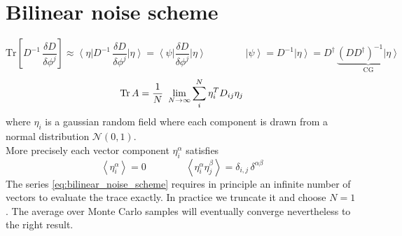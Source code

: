 \section{Bilinear noise scheme}
\begin{equation*}
    \text{Tr} \left[ D^{-1} \, \frac{\delta D}{\delta \phi^j} \right] \approx \left\langle \eta \right|  D^{-1} \, \frac{\delta D}{\delta \phi^j} \left| \eta \right\rangle = 
    \left\langle \psi \right| \frac{\delta D}{\delta \phi^j} \left| \eta \right\rangle
    \qquad\qquad \left| \psi \right\rangle = D^{-1} \left| \eta \right\rangle = D^\dagger \, \underbrace{(D D^\dagger)^{-1} \left| \eta \right\rangle}_{\text{CG}}
\end{equation*}
\begin{equation}
    \operatorname{\text{Tr}} {A} = \frac{1}{N} \ \lim_{N \to \infty} \sum_i^N \eta_i^T D_{ij} \eta_j
    \label{eq:bilinear_noise_scheme}
\end{equation}
where $\eta_i$ is a gaussian random field where each component is drawn from a normal distribution $\mathcal{N}(0,1)$. \\
More precisely each vector component $\eta_i^\alpha$ satisfies
\begin{equation*}
    \left\langle \eta_i^{\alpha} \right\rangle = 0 \qquad\qquad \left\langle \eta_i^{\alpha}\eta_j^{\beta} \right\rangle = \delta_{i,j} \, \delta^{\alpha \beta}
\end{equation*}
The series \eqref{eq:bilinear_noise_scheme} requires in principle an infinite number of vectors to evaluate the trace exactly. In practice we truncate it and choose $N=1$ . The average over Monte Carlo samples will eventually converge nevertheless to the right result. \\~\\
